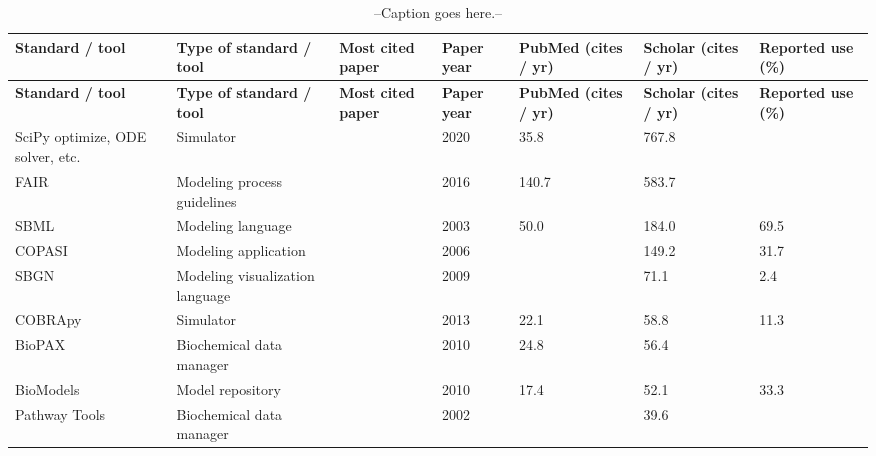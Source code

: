 
\begin{longtable}{L{2.2cm}L{4cm}L{1cm}L{0.8cm}R{1.1cm}R{1cm}R{1cm}}
\caption{--Caption goes here.--}\\
\toprule
\textbf{\scriptsize{Standard / tool}} &\textbf{\scriptsize{Type of standard / tool}} &\textbf{\scriptsize{Most cited paper}} &\textbf{\scriptsize{Paper year}} &\textbf{\scriptsize{PubMed (cites / yr)}} &\textbf{\scriptsize{Scholar (cites / yr)}} &\textbf{\scriptsize{Reported use (\%)}}\\
\endfirsthead
\toprule
\textbf{\scriptsize{Standard / tool}} &\textbf{\scriptsize{Type of standard / tool}} &\textbf{\scriptsize{Most cited paper}} &\textbf{\scriptsize{Paper year}} &\textbf{\scriptsize{PubMed (cites / yr)}} &\textbf{\scriptsize{Scholar (cites / yr)}} &\textbf{\scriptsize{Reported use (\%)}}\\
\midrule
\endhead
\midrule
\small{SciPy optimize, ODE solver, etc.} &\small{Simulator} &\cite{virtanen2020scipy} &\small{2020} &\small{35.8} &\small{767.8} &\small{}\\
\midrule
\small{FAIR} &\small{Modeling process guidelines} &\cite{Wilkinson2016TheStewardship.} &\small{2016} &\small{140.7} &\small{583.7} &\small{}\\
\midrule
\small{SBML} &\small{Modeling language} &\cite{Hucka2003TheModels} &\small{2003} &\small{50.0} &\small{184.0} &\small{69.5}\\
\midrule
\small{COPASI} &\small{Modeling application} &\cite{Hoops2006COPASI--aSImulator} &\small{2006} &\small{} &\small{149.2} &\small{31.7}\\
\midrule
\small{SBGN} &\small{Modeling visualization language} &\cite{Novere2009TheNotation} &\small{2009} &\small{} &\small{71.1} &\small{2.4}\\
\midrule
\small{COBRApy} &\small{Simulator} &\cite{ebrahim2013cobrapy} &\small{2013} &\small{22.1} &\small{58.8} &\small{11.3}\\
\midrule
\small{BioPAX} &\small{Biochemical data manager} &\cite{Demir2010TheSharing.} &\small{2010} &\small{24.8} &\small{56.4} &\small{}\\
\midrule
\small{BioModels} &\small{Model repository} &\cite{Li2010BioModelsModels} &\small{2010} &\small{17.4} &\small{52.1} &\small{33.3}\\
\midrule
\small{Pathway Tools} &\small{Biochemical data manager} &\cite{karp2002pathway} &\small{2002} &\small{} &\small{39.6} &\small{}\\

\end{longtable}
